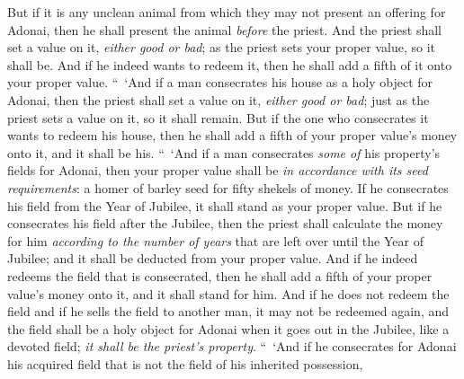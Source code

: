 \begin{biblechapter}
\verse But if it is any unclean animal from which they may not present an offering for Adonai, then he shall present the animal \textit{before} the priest.
\verse And the priest shall set a value on it, \textit{either good or bad}; as the priest sets your proper value, so it shall be.
\verse And if he indeed wants to redeem it, then he shall add a fifth of it onto your proper value.
\verse “ ‘And if a man consecrates his house as a holy object for Adonai, then the priest shall set a value on it, \textit{either good or bad}; just as the priest sets a value on it, so it shall remain.
\verse But if the one who consecrates it wants to redeem his house, then he shall add a fifth of your proper value’s money onto it, and it shall be his.
\verse “ ‘And if a man consecrates \textit{some of} his property’s fields for Adonai, then your proper value shall be \textit{in accordance with its seed requirements}: a homer of barley seed for fifty shekels of money.
\verse If he consecrates his field from the Year of Jubilee, it shall stand as your proper value.
\verse But if he consecrates his field after the Jubilee, then the priest shall calculate the money for him \textit{according to the number of years} that are left over until the Year of Jubilee; and it shall be deducted from your proper value.
\verse And if he indeed redeems the field that is consecrated, then he shall add a fifth of your proper value’s money onto it, and it shall stand for him.
\verse And if he does not redeem the field and if he sells the field to another man, it may not be redeemed again,
\verse and the field shall be a holy object for Adonai when it goes out in the Jubilee, like a devoted field; \textit{it shall be the priest’s property}.
\verse “ ‘And if he consecrates for Adonai his acquired field that is not the field of his inherited possession,

\end{biblechapter}
